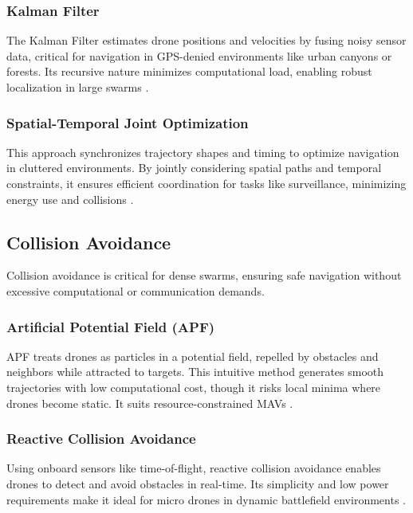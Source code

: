 \documentclass{article}
\begin{document}
\subsubsection{Kalman Filter}
The Kalman Filter estimates drone positions and velocities by fusing noisy sensor data, critical for navigation in GPS-denied environments like urban canyons or forests. Its recursive nature minimizes computational load, enabling robust localization in large swarms \cite{Kalman1960, Welch2006}.

\subsubsection{Spatial-Temporal Joint Optimization}
This approach synchronizes trajectory shapes and timing to optimize navigation in cluttered environments. By jointly considering spatial paths and temporal constraints, it ensures efficient coordination for tasks like surveillance, minimizing energy use and collisions \cite{Lin2018, Chen2020}.

\subsection{Collision Avoidance}
Collision avoidance is critical for dense swarms, ensuring safe navigation without excessive computational or communication demands.

\subsubsection{Artificial Potential Field (APF)}
APF treats drones as particles in a potential field, repelled by obstacles and neighbors while attracted to targets. This intuitive method generates smooth trajectories with low computational cost, though it risks local minima where drones become static. It suits resource-constrained MAVs \cite{Khatib1986, Zhang2020}.

\subsubsection{Reactive Collision Avoidance}
Using onboard sensors like time-of-flight, reactive collision avoidance enables drones to detect and avoid obstacles in real-time. Its simplicity and low power requirements make it ideal for micro drones in dynamic battlefield environments \cite{Gageik2015, Lin2020}.
\end{document}
